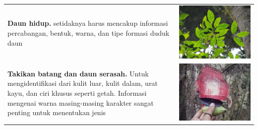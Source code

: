 \documentclass[
  oneside]{book}
\begin{document}
\begin{longtable}[]{@{}
  >{\raggedright\arraybackslash}p{}
  >{\raggedright\arraybackslash}p{}@{}}
\textbf{Daun hidup.} setidaknya harus mencakup informasi percabangan, bentuk, warna, dan tipe formasi duduk daun & \includegraphics{images/gkj2.jpg} \\
\textbf{Takikan batang dan daun serasah.} Untuk mengidentifikasi dari kulit luar, kulit dalam, urat kayu, dan ciri khusus seperti getah. Informasi mengenai warna masing-masing karakter sangat penting untuk menentukan jenis & \includegraphics{images/gkj3.jpg} \\

\end{longtable}
\end{document}
